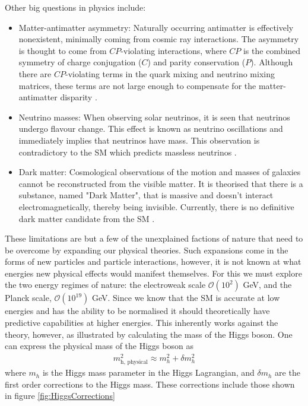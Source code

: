 Other big questions in physics include:
\begin{itemize}
\item Matter-antimatter asymmetry: Naturally occurring antimatter is effectively nonexistent, minimally coming from cosmic ray interactions. 
The asymmetry is thought to come from $CP$-violating interactions, where $CP$ is the combined symmetry of charge conjugation ($C$) and parity conservation ($P$).  
Although there are $CP$-violating terms in the quark mixing and neutrino mixing matrices, these terms are not large enough to compensate for the matter-antimatter disparity \cite{canetti2012matter}.

\item Neutrino masses: When observing solar neutrinos, it is seen that neutrinos undergo flavour change. 
This effect is known as neutrino oscillations and immediately implies that neutrinos have mass.
This observation is contradictory to the SM which predicts massless neutrinos \cite{olive2014review}.

\item Dark matter: Cosmological observations of the motion and masses of galaxies cannot be reconstructed from the visible matter.
It is theorised that there is a substance, named "Dark Matter", that is massive and doesn't interact electromagnetically, thereby being invisible.
Currently, there is no definitive dark matter candidate from the SM \cite{bertone2005particle}. 
\end{itemize}
These limitations are but a few of the unexplained factions of nature that need to be overcome by expanding our physical theories.
Such expansions come in the forms of new particles and particle interactions, however, it is not known at what energies new physical effects would manifest themselves.
For this we must explore the two energy regimes of nature: the electroweak scale $\mathcal{O}(10^{2})$ GeV, and the Planck scale, $\mathcal{O}(10^{19})$ GeV.
Since we know that the SM is accurate at low energies and has the ability to be normalised it should theoretically have predictive capabilities at higher energies.
This inherently works against the theory, however, as illustrated by calculating the mass of the Higgs boson.
One can express the physical mass of the Higgs boson as 
\begin{align}
m_{\textrm{h, physical}}^{2} \approx m_{h}^{2} + \delta m_{h}^{2}
\end{align}
where $m_{h}$ is the Higgs mass parameter in the Higgs Lagrangian, and $\delta m_{h}$ are the first order corrections to the Higgs mass.
These corrections include those shown in figure \ref{fig:HiggsCorrections}

